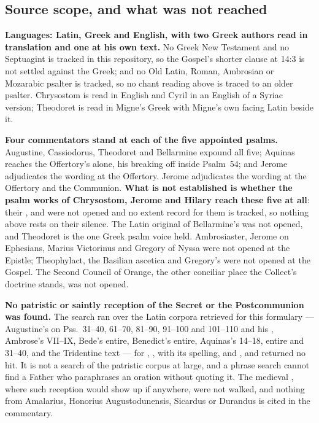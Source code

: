 \subsection*{Source scope, and what was not reached}

\textbf{Languages: Latin, Greek and English, with two Greek authors read in
translation and one at his own text.} No Greek New Testament and no Septuagint
is tracked in this repository, so the Gospel's shorter clause at 14:3 is not
settled against the Greek; and no Old Latin, Roman, Ambrosian or Mozarabic
psalter is tracked, so no chant reading above is traced to an older psalter.
Chrysostom is read in English and Cyril in an English of a Syriac version;
Theodoret is read in Migne's Greek with Migne's own facing Latin beside it.

\textbf{Four commentators stand at each of the five appointed psalms.}
Augustine, Cassiodorus, Theodoret and Bellarmine expound all five; Aquinas
reaches the Offertory's alone, his  breaking off
inside Psalm~54; and%
\ifdefined\TriptychSynthesisEdition{} Jerome adjudicates the wording at the
Offertory.%
\else{} Jerome adjudicates the wording at the Offertory and the
Communion.%
\fi{} \textbf{What is not established is whether the psalm works of
Chrysostom, Jerome and Hilary reach these five at all}: their
,  and
 were not opened and no extent record for them is
tracked, so nothing above rests on their silence. The Latin original of
Bellarmine's  was not opened, and Theodoret is the
one Greek psalm voice held. Ambrosiaster, Jerome on Ephesians, Marius Victorinus
and Gregory of Nyssa were not opened at the Epistle; Theophylact, the Basilian
ascetica and Gregory's  were not opened at the Gospel. The Second
Council of Orange, the other conciliar place the Collect's doctrine stands, was
not opened.

\textbf{No patristic or saintly reception of the Secret or the Postcommunion was
found.} The search ran over the Latin corpora retrieved for this formulary ---
Augustine's  on Pss.~31--40, 61--70, 81--90, 91--100 and
101--110 and his , Ambrose's 
VII--IX, Bede's  entire, Benedict's  entire,
Aquinas's  14--18,  entire and
 31--40, and the Tridentine text --- for , , 
with its  spelling, and , and returned no
hit. It is not a search of the patristic corpus at large, and a phrase search
cannot find a Father who paraphrases an oration without quoting it. The medieval
, where such reception would show up if anywhere, were
not walked, and nothing from Amalarius, Honorius Augustodunensis, Sicardus or
Durandus is cited in the commentary.

